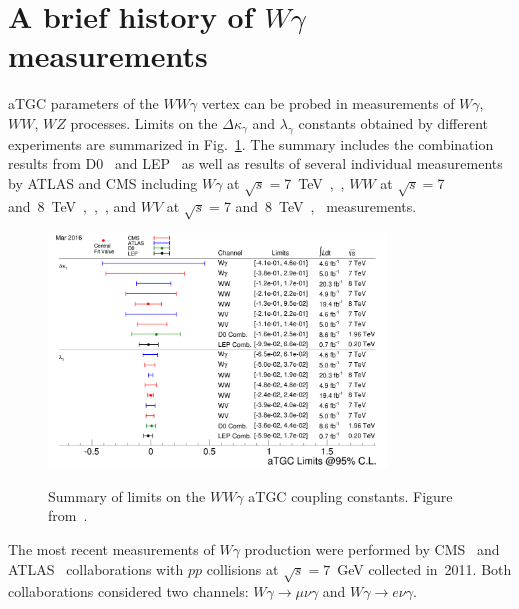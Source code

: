 \section{A brief history of $W\gamma$ measurements}


\label{sec:WgAbout_PastMeas}
aTGC parameters of the $WW\gamma$ vertex can be probed in measurements of $W\gamma$, $WW$, $WZ$ processes. Limits on the $\Delta \kappa_\gamma$ and $\lambda_\gamma$ constants obtained by different experiments are summarized in Fig.~\ref{fig:aTGC_cg}. The summary includes the combination results from D0~\cite{ref_D0_aTGC_comb} and LEP~\cite{ref_LEP_aTGC_comb} as well as results of several individual measurements by ATLAS and CMS including $W\gamma$ at $\sqrt{s}=$7~TeV~\cite{ref_7TeV_ATLAS},~\cite{ref_7TeV_CMS}, $WW$ at $\sqrt{s}=$7 and~8~TeV~\cite{ref_ATLAS_WW_8TeV},~\cite{ref_CMS_WW_7TeV},~\cite{ref_CMS_WW_8TeV}, and $WV$ at $\sqrt{s}=$7 and~8~TeV~\cite{ref_ATLAS_VW_8TeV},~\cite{ref_CMS_VW_7TeV} measurements.
 
\begin{figure}[htb]
  \begin{center}
    {\includegraphics[width=0.80\textwidth]{../figs/WgAbout/aTGC_cg.png}}
    \caption{Summary of limits on the $WW\gamma$ aTGC coupling constants. Figure from~\cite{ref_twiki_SMP_ATGC}.}
    \label{fig:aTGC_cg}
  \end{center}
\end{figure}

The most recent measurements of $W\gamma$ production were performed by CMS~\cite{ref_7TeV_CMS} and ATLAS~\cite{ref_7TeV_ATLAS} collaborations with $pp$ collisions at $\sqrt{s}=7$~GeV collected in~2011. Both collaborations considered two channels: $W\gamma\rightarrow\mu\nu\gamma$ and $W\gamma\rightarrow e\nu\gamma$.

